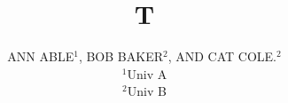 \documentclass{article}
\begin{document}
\title{T}
\author{\uppercase{Ann Able$^{1}$}, \uppercase{Bob Baker$^{2}$, and Cat Cole}.$^{2}$ \\ $^1$Univ A \\ $^2$Univ B}
\maketitle
\end{document}
